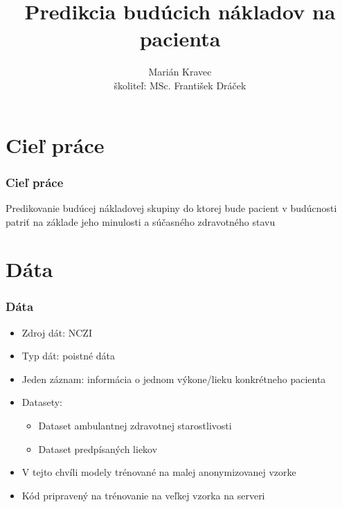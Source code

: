 \documentclass[slovak]{beamer}
\title[Predikcia budúcich nákladov na pacienta]{Predikcia budúcich nákladov na pacienta}
\author[]{Marián Kravec \\ školiteľ: MSc. František Dráček }
\date{}
\begin{document}
\begin{frame}
  \titlepage
\end{frame}




\section{Cieľ práce}

\begin{frame}
  \frametitle{Cieľ práce}
	Predikovanie budúcej nákladovej skupiny do ktorej bude pacient v budúcnosti patriť na základe jeho minulosti a súčasného zdravotného stavu 
\end{frame}


\section{Dáta}

\begin{frame}  
	\frametitle{Dáta}
	\begin{itemize}
		\item<1> Zdroj dát: NCZI
		\item<1> Typ dát: poistné dáta
		\item<1> Jeden záznam: informácia o jednom výkone/lieku konkrétneho pacienta
		\item<1> Datasety:
		\begin{itemize}
			\item<1> Dataset ambulantnej zdravotnej starostlivosti 
			\item<1> Dataset predpísaných liekov
		\end{itemize}
		\item<1> V tejto chvíli modely trénované na malej anonymizovanej vzorke
		\item<1> Kód pripravený na trénovanie na veľkej vzorka na serveri
	\end{itemize} 
\end{frame}
\end{document}
